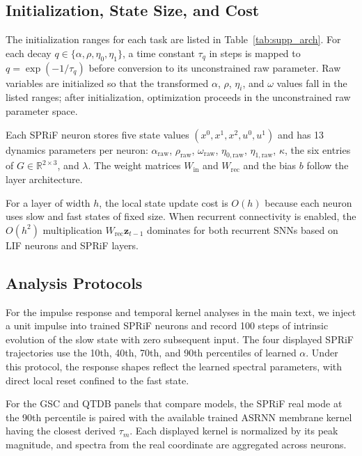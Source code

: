 \documentclass[letterpaper]{article}
\begin{document}
\subsection{Initialization, State Size, and Cost}
\label{supp:sec:initialization-cost}

The initialization ranges for each task are listed in Table~\ref{tab:supp_arch}. For each decay $q\in\{\alpha,\rho,\eta_0,\eta_1\}$, a time constant $\tau_q$ in steps is mapped to $q=\exp(-1/\tau_q)$ before conversion to its unconstrained raw parameter. Raw variables are initialized so that the transformed $\alpha$, $\rho$, $\eta_i$, and $\omega$ values fall in the listed ranges; after initialization, optimization proceeds in the unconstrained raw parameter space.

Each SPRiF neuron stores five state values $(x^0,x^1,x^2,u^0,u^1)$ and has 13 dynamics parameters per neuron: $\alpha_{\mathrm{raw}}$, $\rho_{\mathrm{raw}}$, $\omega_{\mathrm{raw}}$, $\eta_{0,\mathrm{raw}}$, $\eta_{1,\mathrm{raw}}$, $\kappa$, the six entries of $G\in\mathbb{R}^{2\times3}$, and $\lambda$. The weight matrices $W_{\mathrm{in}}$ and $W_{\mathrm{rec}}$ and the bias $b$ follow the layer architecture.

For a layer of width $h$, the local state update cost is $O(h)$ because each neuron uses slow and fast states of fixed size. When recurrent connectivity is enabled, the $O(h^2)$ multiplication $W_{\mathrm{rec}}\mathbf{z}_{t-1}$ dominates for both recurrent SNNs based on LIF neurons and SPRiF layers.

\subsection{Analysis Protocols}
\label{supp:sec:analysis-protocols}

For the impulse response and temporal kernel analyses in the main text, we inject a unit impulse into trained SPRiF neurons and record 100 steps of intrinsic evolution of the slow state with zero subsequent input. The four displayed SPRiF trajectories use the 10th, 40th, 70th, and 90th percentiles of learned $\alpha$. Under this protocol, the response shapes reflect the learned spectral parameters, with direct local reset confined to the fast state.

For the GSC and QTDB panels that compare models, the SPRiF real mode at the 90th percentile is paired with the available trained ASRNN membrane kernel having the closest derived $\tau_m$. Each displayed kernel is normalized by its peak magnitude, and spectra from the real coordinate are aggregated across neurons.
\end{document}
